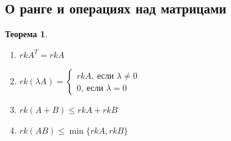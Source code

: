 \documentclass[a4paper, 12pt]{article}
\newcommand\tab[1][.5cm]{\hspace*{#1}}
\theoremstyle{definition}
\newtheorem*{theorem}{Теорема}
\begin{document}
  \subsection{О ранге и операциях над матрицами}
  \begin{theorem} \tab
    \begin{enumerate}
      \item $rkA^T = rkA$
      \item $rk(\lambda A) = \begin{cases}
        rkA, \ \text{если } \lambda \neq 0 \\
        0, \ \text{если } \lambda = 0
      \end{cases}
      $ 
      \item $rk(A+B) \leq rkA + rkB$ 
      \item $rk(AB) \leq \min\{rkA, rkB\}$ 
    \end{enumerate}
  \end{theorem}   
\end{document}
